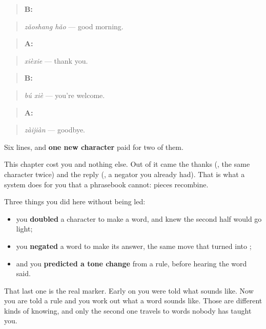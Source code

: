 \begin{quote}
\textbf{B:} 
\end{quote}

\begin{quote}
\emph{zǎoshang hǎo} — good morning.
\end{quote}

\begin{quote}
\textbf{A:} 
\end{quote}

\begin{quote}
\emph{xièxie} — thank you.
\end{quote}

\begin{quote}
\textbf{B:} 
\end{quote}

\begin{quote}
\emph{bú xiè} — you're welcome.
\end{quote}

\begin{quote}
\textbf{A:} 
\end{quote}

\begin{quote}
\emph{zàijiàn} — goodbye.
\end{quote}

Six lines, and \textbf{one new character} paid for two of them.

\begin{grammarlens}[title={What you've built — one character, a whole exchange}]
This chapter cost you  and nothing else. Out of it came the thanks (\textbf{}, the same character twice) and the reply (\textbf{}, a negator you already had). That is what a system does for you that a phrasebook cannot: pieces recombine.

Three things you did here without being led:

\begin{itemize}
\raggedright
  \item you \textbf{doubled} a character to make a word, and knew the second half would go light;
  \item you \textbf{negated} a word to make its answer, the same move that turned  into ;
  \item and you \textbf{predicted a tone change} from a rule, before hearing the word said.
\end{itemize}

That last one is the real marker. Early on you were told what  sounds like. Now you are told a rule and you work out what a word sounds like. Those are different kinds of knowing, and only the second one travels to words nobody has taught you.
\end{grammarlens}

